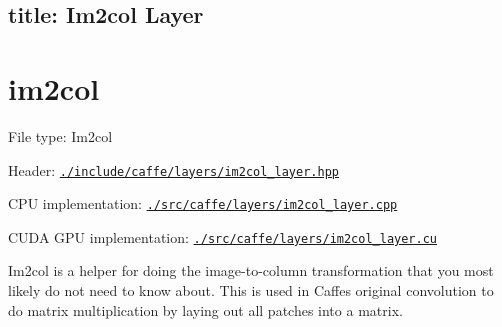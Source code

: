 

 \subsection*{title\+: Im2col Layer }

\section*{im2col}


\begin{DoxyItemize}
\item File type\+: {\ttfamily Im2col}
\item Header\+: \href{https://github.com/BVLC/caffe/blob/master/include/caffe/layers/im2col_layer.hpp}{\tt {\ttfamily ./include/caffe/layers/im2col\+\_\+layer.hpp}}
\item C\+PU implementation\+: \href{https://github.com/BVLC/caffe/blob/master/src/caffe/layers/im2col_layer.cpp}{\tt {\ttfamily ./src/caffe/layers/im2col\+\_\+layer.cpp}}
\item C\+U\+DA G\+PU implementation\+: \href{https://github.com/BVLC/caffe/blob/master/src/caffe/layers/im2col_layer.cu}{\tt {\ttfamily ./src/caffe/layers/im2col\+\_\+layer.cu}}
\end{DoxyItemize}

{\ttfamily Im2col} is a helper for doing the image-\/to-\/column transformation that you most likely do not need to know about. This is used in Caffe\textquotesingle{}s original convolution to do matrix multiplication by laying out all patches into a matrix. 